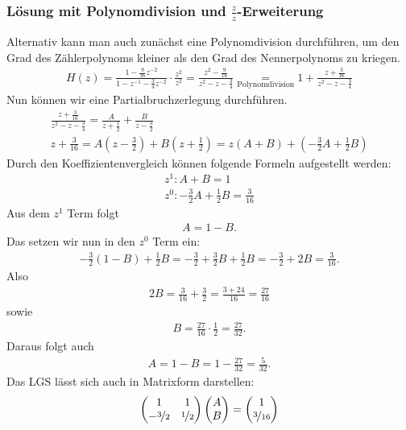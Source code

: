 \documentclass[11pt,a4paper,DIV=12]{scrartcl}
\begin{document}
\subsubsection*{Lösung mit Polynomdivision und $\frac{z}{z}$-Erweiterung}
%
Alternativ kann man auch zunächst eine Polynomdivision durchführen, 
um den Grad des Zählerpolynoms kleiner als den Grad des Nennerpolynoms 
zu kriegen.
%
\begin{gather}
	H(z)=
	\frac{1-\frac{9}{16}z^{-2}}{1-z^{-1}-\frac{3}{4}z^{-2}}\cdot\frac{z^2}{z^2}
	=\frac{z^2-\frac{9}{16}}{z^2-z-\frac{3}{4}}
	\underset{\text{Polynomdivision}}{=}1+\frac{z+\frac{3}{16}}{z^2-z-\frac{3}{4}}
\end{gather}
%
Nun können wir eine Partialbruchzerlegung durchführen.
%
\begin{gather}
	\frac{z+\frac{3}{16}}{z^2-z-\frac{3}{4}}=\frac{A}{z+\frac{1}{2}}+\frac{B}{z-\frac{3}{2}}\\
	z+\frac{3}{16}=A\left(z-\frac{3}{2}\right)+B\left(z+\frac{1}{2}\right)=z\left(A+B\right)+\left(-\frac{3}{2}A+\frac{1}{2}B\right)
\end{gather}
%
Durch den Koeffizientenvergleich können folgende Formeln aufgestellt werden:
%
\begin{gather}
	z^1: A+B=1\\
	z^0: -\frac{3}{2}A+\frac{1}{2}B=\frac{3}{16}
\end{gather}
%
Aus dem $z^1$ Term folgt
%
\begin{gather}
	A=1-B.
\end{gather}
%
Das setzen wir nun in den $z^0$ Term ein:
%
\begin{gather}
	-\frac{3}{2}(1-B)+\frac{1}{2}B=-\frac{3}{2}+\frac{3}{2}B+\frac{1}{2}B=-\frac{3}{2}+2B=\frac{3}{16}.
\end{gather}
%
Also
%
\begin{gather}
	2B=\frac{3}{16}+\frac{3}{2}=\frac{3+24}{16}=\frac{27}{16}
\end{gather}
%
sowie
%
\begin{gather}
	B=\frac{27}{16}\cdot\frac{1}{2}=\frac{27}{32}.
\end{gather}
%
Daraus folgt auch
%
\begin{gather}
	A=1-B=1-\frac{27}{32}=\frac{5}{32}.
\end{gather}
%
Das LGS lässt sich auch in Matrixform darstellen:
%
\begin{gather}
	\begin{pmatrix}
		1 & 1\\
		-\nicefrac{3}{2} & \nicefrac{1}{2}
	\end{pmatrix}
	\begin{pmatrix}
		A \\
		B
	\end{pmatrix}
	=
	\begin{pmatrix}
		1 \\
		\nicefrac{3}{16}
	\end{pmatrix}
\end{gather}
\end{document}
